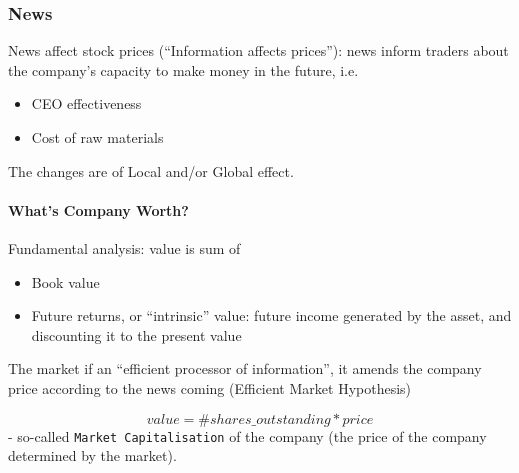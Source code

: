 \documentclass{scrartcl}
\newcommand{\term}[1]{\verb~#1~} %
\begin{document}
\subsubsection{News}
\label{sec:News}
News affect stock prices (``Information affects prices''): news inform traders
about the company's capacity to make money in the future, i.e.
\begin{itemize}
\item CEO effectiveness
\item Cost of raw materials
\end{itemize}
The changes are of Local and/or Global effect.

\paragraph{What's Company Worth?}

Fundamental analysis: value is sum of
\begin{itemize}
\item Book value
\item Future returns, or ``intrinsic'' value: future income generated by the
  asset, and discounting it to the present value
\end{itemize}

The market if an ``efficient processor of information'', it amends the company
price according to the news coming (Efficient Market Hypothesis)

$$value = \#shares\_outstanding * price $$
- so-called \term{Market Capitalisation} of the company (the price of the
company determined by the market).

\end{document}
